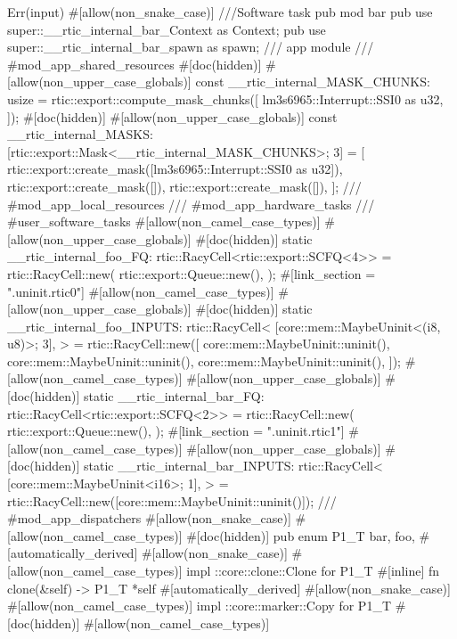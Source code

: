 {{{{                Err(input)
            }
        }
    }
    #[allow(non_snake_case)]
    ///Software task
    pub mod bar {
        pub use super::__rtic_internal_bar_Context as Context;
        pub use super::__rtic_internal_bar_spawn as spawn;
    }
    /// app module
    /// #mod_app_shared_resources
    #[doc(hidden)]
    #[allow(non_upper_case_globals)]
    const __rtic_internal_MASK_CHUNKS: usize = rtic::export::compute_mask_chunks([
        lm3s6965::Interrupt::SSI0 as u32,
    ]);
    #[doc(hidden)]
    #[allow(non_upper_case_globals)]
    const __rtic_internal_MASKS: [rtic::export::Mask<__rtic_internal_MASK_CHUNKS>; 3] = [
        rtic::export::create_mask([lm3s6965::Interrupt::SSI0 as u32]),
        rtic::export::create_mask([]),
        rtic::export::create_mask([]),
    ];
    /// #mod_app_local_resources
    /// #mod_app_hardware_tasks
    /// #user_software_tasks
    #[allow(non_camel_case_types)]
    #[allow(non_upper_case_globals)]
    #[doc(hidden)]
    static __rtic_internal_foo_FQ: rtic::RacyCell<rtic::export::SCFQ<4>> = rtic::RacyCell::new(
        rtic::export::Queue::new(),
    );
    #[link_section = ".uninit.rtic0"]
    #[allow(non_camel_case_types)]
    #[allow(non_upper_case_globals)]
    #[doc(hidden)]
    static __rtic_internal_foo_INPUTS: rtic::RacyCell<
        [core::mem::MaybeUninit<(i8, u8)>; 3],
    > = rtic::RacyCell::new([
        core::mem::MaybeUninit::uninit(),
        core::mem::MaybeUninit::uninit(),
        core::mem::MaybeUninit::uninit(),
    ]);
    #[allow(non_camel_case_types)]
    #[allow(non_upper_case_globals)]
    #[doc(hidden)]
    static __rtic_internal_bar_FQ: rtic::RacyCell<rtic::export::SCFQ<2>> = rtic::RacyCell::new(
        rtic::export::Queue::new(),
    );
    #[link_section = ".uninit.rtic1"]
    #[allow(non_camel_case_types)]
    #[allow(non_upper_case_globals)]
    #[doc(hidden)]
    static __rtic_internal_bar_INPUTS: rtic::RacyCell<
        [core::mem::MaybeUninit<i16>; 1],
    > = rtic::RacyCell::new([core::mem::MaybeUninit::uninit()]);
    /// #mod_app_dispatchers
    #[allow(non_snake_case)]
    #[allow(non_camel_case_types)]
    #[doc(hidden)]
    pub enum P1_T {
        bar,
        foo,
    }
    #[automatically_derived]
    #[allow(non_snake_case)]
    #[allow(non_camel_case_types)]
    impl ::core::clone::Clone for P1_T {
        #[inline]
        fn clone(&self) -> P1_T {
            *self
        }
    }
    #[automatically_derived]
    #[allow(non_snake_case)]
    #[allow(non_camel_case_types)]
    impl ::core::marker::Copy for P1_T {}
    #[doc(hidden)]
    #[allow(non_camel_case_types)]
}
